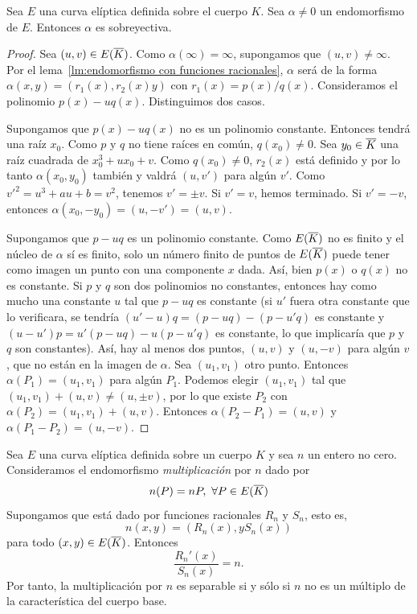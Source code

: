 \begin{proposicion}\label{pp:sobreyectividad endomorfismos}
	Sea $E$ una curva elíptica definida sobre el cuerpo $K$. Sea $\alpha \neq 0$ un endomorfismo de $E$. Entonces $\alpha$ es sobreyectiva.
\end{proposicion}
\begin{proof}
Sea $(u, v) \in E(\overline{K})$. Como $\alpha(\infty) = \infty$, supongamos que $(u, v) \neq \infty$. Por el lema~\ref{lm:endomorfismo con funciones racionales}, $\alpha$ será de la forma $\alpha(x, y) = (r_1(x), r_2(x) y)$ con $r_1(x) = p(x) / q(x)$. Consideramos el polinomio $p(x) - u q(x)$. Distinguimos dos casos.

Supongamos que $p(x) - u q(x)$ no es un polinomio constante. Entonces tendrá una raíz $x_0$. Como $p$ y $q$ no tiene raíces en común, $q(x_0) \neq 0$. Sea $y_0 \in \overline{K}$ una raíz cuadrada de $x_0^3 + u x_0 + v$. Como $q(x_0) \neq 0$, $r_2(x)$ está definido y por lo tanto $\alpha(x_0, y_0)$ también y valdrá $(u, v')$ para algún $v'$. Como $v'^2 = u^3 + a u + b = v^2$, tenemos $v' = \pm v$. Si $v' = v$, hemos terminado. Si $v' = -v$, entonces $\alpha(x_0, -y_0) = (u, -v') = (u, v)$.

Supongamos que $p - uq$ es un polinomio constante. Como $E(\overline{K})$ no es finito y el núcleo de $\alpha$ sí es finito, solo un número finito de puntos de $E(\overline{K})$ puede tener como imagen un punto con una componente $x$ dada. Así, bien $p(x)$ o $q(x)$ no es constante. Si $p$ y $q$ son dos polinomios no constantes, entonces hay como mucho una constante $u$ tal que $p - uq$ es constante (si $u'$ fuera otra constante que lo verificara, se tendría $(u' - u)q = (p - u q) - (p - u' q)$ es constante y $(u - u') p = u' (p - u q) - u (p - u' q)$ es constante, lo que implicaría que $p$ y $q$ son constantes). Así, hay al menos dos puntos, $(u, v)$ y $(u, -v)$ para algún $v$, que no están en la imagen de $\alpha$. Sea $(u_1, v_1)$ otro punto. Entonces $\alpha(P_1) = (u_1, v_1)$ para algún $P_1$. Podemos elegir $(u_1, v_1)$ tal que $(u_1, v_1) + (u, v) \neq (u, \pm v)$, por lo que existe $P_2$ con $\alpha(P_2) = (u_1, v_1) + (u, v)$. Entonces $\alpha(P_2 - P_1) = (u, v)$ y $\alpha(P_1 - P_2) = (u, -v)$.

\end{proof}

\begin{proposicion}\label{pp:endomorfismo multiplicación}
	Sea $E$ una curva elíptica definida sobre un cuerpo $K$ y sea $n$ un entero no cero. Consideramos el endomorfismo \emph{multiplicación} por $n$  dado por
	$$
		n(P) = n P,\ \forall P \in E(\overline{K})
	$$
	Supongamos que está dado por funciones racionales $R_n$ y $S_n$, esto es,
	$$
		n(x, y) = (R_n(x), y S_n(x))
	$$
	para todo $(x, y) \in E(\overline{K})$. Entonces
	$$
		\frac{R_n'(x)}{S_n(x)} = n.
	$$
	Por tanto, la multiplicación por $n$ es separable si y sólo si $n$ no es un múltiplo de la característica del cuerpo base.
\end{proposicion}


